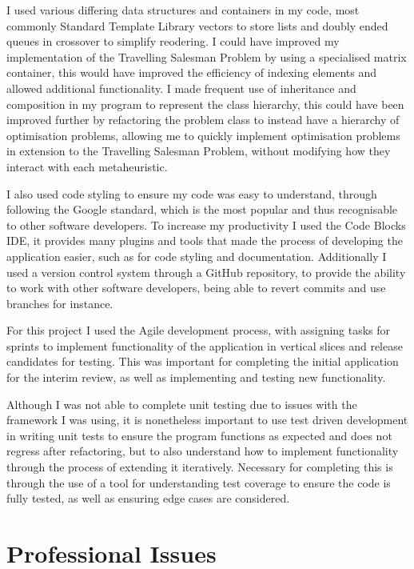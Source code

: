 \documentclass[]{final_report}
\begin{document}
I used various differing data structures and containers in my code, most commonly Standard Template Library vectors to store lists and doubly ended queues in crossover to simplify reodering. I could have improved my implementation of the Travelling Salesman Problem by using a specialised matrix container, this would have improved the efficiency of indexing elements and allowed additional functionality. I made frequent use of inheritance and composition in my program to represent the class hierarchy, this could have been improved further by refactoring the problem class to instead have a hierarchy of optimisation problems, allowing me to quickly implement optimisation problems in extension to the Travelling Salesman Problem, without modifying how they interact with each metaheuristic.

I also used code styling to ensure my code was easy to understand, through following the Google standard, which is the most popular and thus recognisable to other software developers. To increase my productivity I used the Code Blocks IDE, it provides many plugins and tools that made the process of developing the application easier, such as for code styling and documentation. Additionally I used a version control system through a GitHub repository, to provide the ability to work with other software developers, being able to revert commits and use branches for instance.

For this project I used the Agile development process, with assigning tasks for sprints to implement functionality of the application in vertical slices and release candidates for testing. This was important for completing the initial application for the interim review, as well as implementing and testing new functionality.

Although I was not able to complete unit testing due to issues with the framework I was using, it is nonetheless important to use test driven development in writing unit tests to ensure the program functions as expected and does not regress after refactoring, but to also understand how to implement functionality through the process of extending it iteratively. Necessary for completing this is through the use of a tool for understanding test coverage to ensure the code is fully tested, as well as ensuring edge cases are considered.

\chapter*{Professional Issues}
\end{document}
